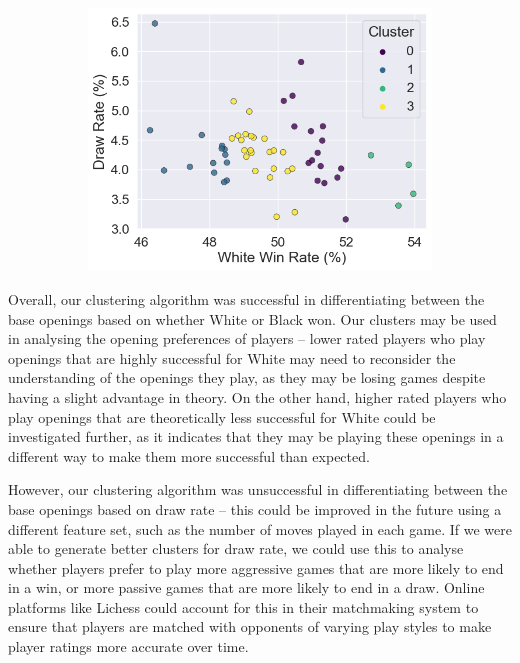 \documentclass[a4paper, 11pt]{article}
\begin{document}
\begin{figure}[H]
\begin{subfigure}{0.49\textwidth}
        \includegraphics[width=\textwidth]{Base Openings Clustered by Game Results (White Win Rate vs Draw Rate).png}
    \end{subfigure}
\end{figure}

Overall, our clustering algorithm was successful in differentiating between the base openings based on whether White or Black won. Our clusters may be used in analysing the opening preferences of players -- lower rated players who play openings that are highly successful for White may need to reconsider the understanding of the openings they play, as they may be losing games despite having a slight advantage in theory. On the other hand, higher rated players who play openings that are theoretically less successful for White could be investigated further, as it indicates that they may be playing these openings in a different way to make them more successful than expected.

However, our clustering algorithm was unsuccessful in differentiating between the base openings based on draw rate -- this could be improved in the future using a different feature set, such as the number of moves played in each game. If we were able to generate better clusters for draw rate, we could use this to analyse whether players prefer to play more aggressive games that are more likely to end in a win, or more passive games that are more likely to end in a draw. Online platforms like Lichess could account for this in their matchmaking system to ensure that players are matched with opponents of varying play styles to make player ratings more accurate over time.
\end{document}
